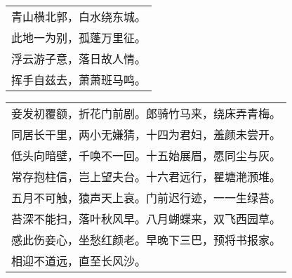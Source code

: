 \nopagebreak%
\nopagebreak%
\noindent\begin{minipage}{\linewidth}
  \vskip-3pt\begin{table}[H]
    \centering
    \begin{tabular}{@{}l@{}}
青山横北郭，白水绕东城。\\
此地一为别，孤蓬万里征。\\
浮云游子意，落日故人情。\\
挥手自兹去，萧萧班马鸣。
    \end{tabular}
  \end{table}
\end{minipage}
\vspace{1cm}


\nopagebreak%
\nopagebreak%
\noindent\begin{minipage}{\linewidth}
  \vskip-3pt\begin{table}[H]
    \centering
    \begin{tabular}{@{}l@{}}
妾发初覆额，折花门前剧。郎骑竹马来，绕床弄青梅。\\
同居长干里，两小无嫌猜，十四为君妇，羞颜未尝开。\\
低头向暗壁，千唤不一回。十五始展眉，愿同尘与灰。\\
常存抱柱信，岂上望夫台。十六君远行，瞿塘滟滪堆。\\
五月不可触，猿声天上哀。门前迟行迹，一一生绿苔。\\
苔深不能扫，落叶秋风早。八月蝴蝶来，双飞西园草。\\
感此伤妾心，坐愁红颜老。早晚下三巴，预将书报家。\\
相迎不道远，直至长风沙。
    \end{tabular}
  \end{table}
\end{minipage}
\vspace{1cm}


